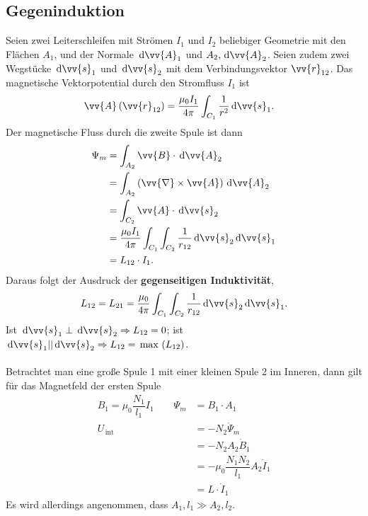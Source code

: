 \documentclass[a4paper,12pt]{article}
\newcommand{\td}{\,\text{d}}
\begin{document}
\subsection{Gegeninduktion}
Seien zwei Leiterschleifen mit Strömen $I_1$ und $I_2$ beliebiger Geometrie mit den Flächen $A_1$, und der Normale $\td \vv{A}_1$ und $A_2,\td \vv{A}_2$. Seien zudem zwei Wegstücke $\td \vv{s}_1$ und $\td \vv{s}_2$ mit dem Verbindungsvektor $\vv{r}_{12}$. Das magnetische Vektorpotential durch den Stromfluss $I_1$ ist
\begin{align*} 
        \vv{A}\left(\vv{r}_{12}\right)&=\dfrac{\mu _0I_1}{4\pi }\int_{C_1}^{}\dfrac{1}{r^2}\td \vv{s}_1
.\end{align*} 
Der magnetische Fluss durch die zweite Spule ist dann
\begin{align*} 
        \Psi _m&=\int_{A_2}^{}\vv{B}\cdot \td \vv{A}_2\\
               &=\int_{A_2}^{}\left(\vv{\nabla }\times \vv{A}\right)\td \vv{A}_2\\
               &=\int_{C_2}^{}\vv{A}\cdot \td \vv{s}_2\\
               &=\dfrac{\mu _0I_1}{4\pi }\int_{C_1}^{}\int_{C_2}^{}\dfrac{1}{r_{12}}\td \vv{s}_2\td \vv{s}_1\\
               &=L_{12}\cdot I_1
.\end{align*} 
Daraus folgt der Ausdruck der \textbf{gegenseitigen Induktivität},
\begin{align*} 
        L_{12}=L_{21}=\dfrac{\mu _0}{4\pi }\int_{C_1}^{}\int_{C_2}^{}\dfrac{1}{r_{12}}\td \vv{s}_2\td \vv{s}_1
.\end{align*} 
Ist $\td \vv{s}_1\perp \td \vv{s}_2\Rightarrow L_{12}=0$; ist $\td \vv{s}_1| |\td \vv{s}_2\Rightarrow L_{12}=\,\text{max}\,\left(L_{12}\right)$.\\\\
Betrachtet man eine große Spule 1 mit einer kleinen Spule 2 im Inneren, dann gilt für das Magnetfeld der ersten Spule
\begin{align*} 
        B_1=\mu _0\dfrac{N_1}{l_1}I_1\qquad \Psi _m&=B_1\cdot A_1\\
        U_{\,\text{int}\,}&=-N_2\dot{\Psi }_m\\
                          &=-N_2A_2\dot{B}_1\\
                          &=-\mu _0\dfrac{N_1N_2}{l_1}A_2\dot{I}_1\\
                          &=L\cdot \dot{I}_1
\end{align*} 
Es wird allerdings angenommen, dass $A_1,l_1\gg A_2,l_2$.
\end{document}
